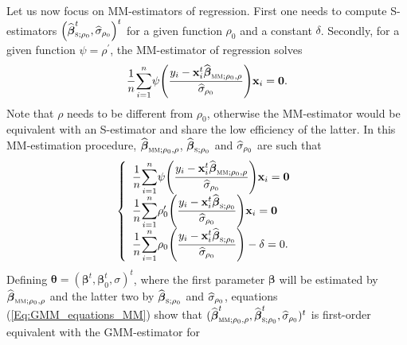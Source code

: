 Let us now focus on MM-estimators of regression. First one needs to compute
S-estimators $\left(  \sthat{\boldsymbol\beta}_{\stsc{S};\rho_{0}}%
^{t},\sthat{\sigma}_{\rho_{0}}\right)  ^{t}$ for a given function $\rho_{0}$
and a constant $\delta$. Secondly, for a given function $\psi=\rho^{\prime}$,
the MM-estimator of regression solves
\[
\dfrac{1}{n}%
{\displaystyle\sum\limits_{i=1}^{n}}
\psi\left(  \dfrac{y_{i}-\stvec{x}_{i}^{t}\sthat{\boldsymbol\beta%
}_{\stsc{MM};\rho_{0},\rho}}{\sthat{\sigma}_{\rho_{0}}}\right)
\stvec{x}_{i}=\mathbf{0}.
\]
Note that $\rho$ needs to be different from $\rho_{0}$, otherwise the
MM-estimator would be equivalent with an S-estimator and share the low
efficiency of the latter. In this MM-estimation procedure, $\widehat
{\boldsymbol\beta}_{\stsc{MM};\rho_{0},\rho}$, $\sthat{\boldsymbol{\beta
}}_{\stsc{S};\rho_{0}}$ and $\widehat{\sigma}_{\rho_{0}}$ are such that
\begin{equation}
\left\{
\begin{array}
[c]{l}%
\dfrac{1}{n}%
{\displaystyle\sum\limits_{i=1}^{n}}
\psi\left(  \dfrac{y_{i}-\stvec{x}_{i}^{t}\sthat{\boldsymbol\beta%
}_{\stsc{MM};\rho_{0},\rho}}{\sthat{\sigma}_{\rho_{0}}}\right)
\stvec{x}_{i}=\mathbf{0}\\
\dfrac{1}{n}%
{\displaystyle\sum\limits_{i=1}^{n}}
\rho_{0}^{\prime}\left(  \dfrac{y_{i}-\stvec{x}_{i}^{t}\widehat
{\boldsymbol\beta}_{\stsc{S};\rho_{0}}}{\sthat{\sigma}_{\rho_{0}}%
}\right)  \stvec{x}_{i}=\mathbf{0}\\
\dfrac{1}{n}%
{\displaystyle\sum\limits_{i=1}^{n}}
\rho_{0}\left(  \dfrac{y_{i}-\stvec{x}_{i}^{t}\sthat{\boldsymbol\beta%
}_{\stsc{S};\rho_{0}}}{\sthat{\sigma}_{\rho_{0}}}\right)  -\delta=0.
\end{array}
\right.  \label{Eq:GMM_equations_MM}%
\end{equation}
Defining $\boldsymbol{\theta}=(\boldsymbol\beta^{t},\boldsymbol\beta%
_{0}^{t},\sigma)^{t}$, where the first parameter $\boldsymbol\beta$ will be
estimated by $\sthat{\boldsymbol\beta}_{\stsc{MM};\rho_{0},\rho}$ and
the latter two by $\sthat{\boldsymbol\beta}_{\stsc{S};\rho_{0}}$ and
$\widehat{\sigma}_{\rho_{0}}$, equations (\ref{Eq:GMM_equations_MM}) show that
$(\sthat{\boldsymbol\beta}_{\stsc{MM};\rho_{0},\rho}^{t},\widehat
{\boldsymbol\beta}_{\stsc{S};\rho_{0}}^{t},\sthat{\sigma}_{\rho_{0}%
})^{t}$ is first-order equivalent with the GMM-estimator for

